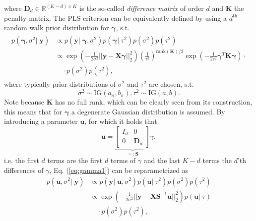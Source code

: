 \documentclass[12pt,letterpaper]{article}
\numberwithin{equation}{subsection}
\begin{document}
where $\mathbf{D}_d \in \mathbb{R}^{(K-d) \times K}$ is the so-called \textit{difference matrix} of order $d$ and $\mathbf{K}$ the penalty matrix. The PLS criterion can be equivalently defined by using a $d^{\text{th}}$ random walk prior distribution for $\mathbf{\gamma}$, s.t. 
\begin{align}
\begin{split}
p(\mathbf{\gamma}, \sigma^2 | \; \mathbf{y}) & \propto  p(\mathbf{y} | \; \mathbf{\gamma}, \sigma^2) p(\mathbf{\gamma} | \; \tau^2) p(\sigma^2) p(\tau^2) \\
& \propto  \exp(-\frac{1}{2\sigma^2}||\mathbf{y} - \mathbf{X}\mathbf{\gamma}||^2_2)
(\frac{1}{\tau^2})^{\text{rank}(\mathbf{K})/2}\exp(-\frac{1}{2\tau^2}\mathbf{\gamma}^T\mathbf{K}\mathbf{\gamma}) \cdot \\
 &  \quad\cdot p(\sigma^2) p(\tau^2),
\end{split}
\label{eq:gamma1}
\end{align}
where typically prior distributions of $\sigma^2$ and $\tau^2$ are chosen, s.t. 
\begin{equation}
\sigma^2 \sim \text{IG}(a_\sigma, b_\sigma), \tau^2 \sim \text{IG}(a, b).
\end{equation}
Note because $\mathbf{K}$ has no full rank, which can be clearly seen from its construction, this means that for $\mathbf{\gamma}$ a degenerate Gaussian distribution is assumed. 
By introducing a parameter $\mathbf{u}$, for which it holds that \begin{equation}
\mathbf{u} = \underbrace{\begin{bmatrix}I_{d} & 0 \\ 0 &\mathbf{D}_d\end{bmatrix}}_{=:\mathbf{S}}\gamma,
\label{eq:urp}
\end{equation} 
i.e. the first $d$ terms are the first $d$ terms of $\gamma$ and the last $K-d$ terms the $d$'th differences of $\gamma$, Eq. (\ref{eq:gamma1}) can be reparametrized as 
\begin{equation}
\begin{split}
p(\mathbf{u}, \sigma^2 | \; \mathbf{y}) & \propto  p(\mathbf{y} | \; \mathbf{u}, \sigma^2) p(\mathbf{u} | \; \tau^2) p(\sigma^2) p(\tau^2) \\
& \propto  \exp(-\frac{1}{2\sigma^2}||\mathbf{y} - \mathbf{X}\mathbf{S}^{-1}\mathbf{u}||^2_2)
p(\mathbf{u}|\;\tau) \\
 &  \quad\cdot p(\sigma^2) p(\tau^2),
\end{split}
\end{equation}
\end{document}
